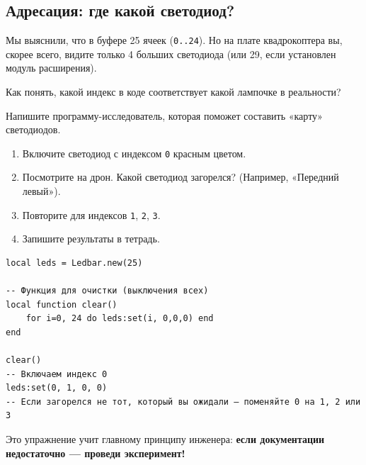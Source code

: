 \subsection{Адресация: где какой светодиод?}

Мы выяснили, что в буфере 25 ячеек (\texttt{0..24}). Но на плате квадрокоптера вы, скорее всего, видите только 4 больших светодиода (или 29, если установлен модуль расширения).

Как понять, какой индекс в коде соответствует какой лампочке в реальности?

\begin{taskbox}
Напишите программу-исследователь, которая поможет составить «карту» светодиодов.
\begin{enumerate}
    \item Включите светодиод с индексом \texttt{0} красным цветом.
    \item Посмотрите на дрон. Какой светодиод загорелся? (Например, «Передний левый»).
    \item Повторите для индексов \texttt{1}, \texttt{2}, \texttt{3}.
    \item Запишите результаты в тетрадь.
\end{enumerate}
\end{taskbox}

\begin{codebox}
\begin{verbatim}
local leds = Ledbar.new(25)

-- Функция для очистки (выключения всех)
local function clear()
    for i=0, 24 do leds:set(i, 0,0,0) end
end

clear()
-- Включаем индекс 0
leds:set(0, 1, 0, 0) 
-- Если загорелся не тот, который вы ожидали — поменяйте 0 на 1, 2 или 3
\end{verbatim}
\end{codebox}

Это упражнение учит главному принципу инженера: \textbf{если документации недостаточно — проведи эксперимент!}
